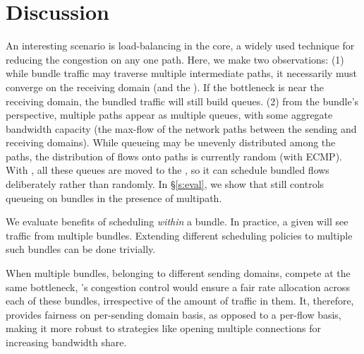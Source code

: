 \section{Discussion}\label{s:discussion}

An interesting scenario is load-balancing in the core, a widely used technique for reducing the congestion on any one path.
Here, we make two observations: 
(1) while bundle traffic may traverse multiple intermediate paths, it necessarily must converge on the receiving domain (and the \outbox). If the bottleneck is near the receiving domain, the bundled traffic will still build queues.
(2) from the bundle's perspective, multiple paths appear as multiple queues, with some aggregate bandwidth capacity (\ie the max-flow of the network paths between the sending and receiving domains). While queueing may be unevenly distributed among the paths, the distribution of flows onto paths is currently random (\eg with ECMP). With \name, all these queues are moved to the \inbox, so it can schedule bundled flows deliberately rather than randomly.
In \S\ref{s:eval}, we show that \name still controls queueing on bundles in the presence of multipath.

 We evaluate benefits of scheduling \emph{within} a bundle. In practice, a given \inbox will see traffic from multiple bundles. Extending different scheduling policies to multiple such bundles can be done trivially.

 When multiple bundles, belonging to different sending domains, compete at the same bottleneck, \name's congestion control would ensure a fair rate allocation across each of these bundles, irrespective of the amount of traffic in them. It, therefore, provides fairness on per-sending domain basis, as opposed to a per-flow basis, making it more robust to strategies like opening multiple connections for increasing bandwidth share. 



